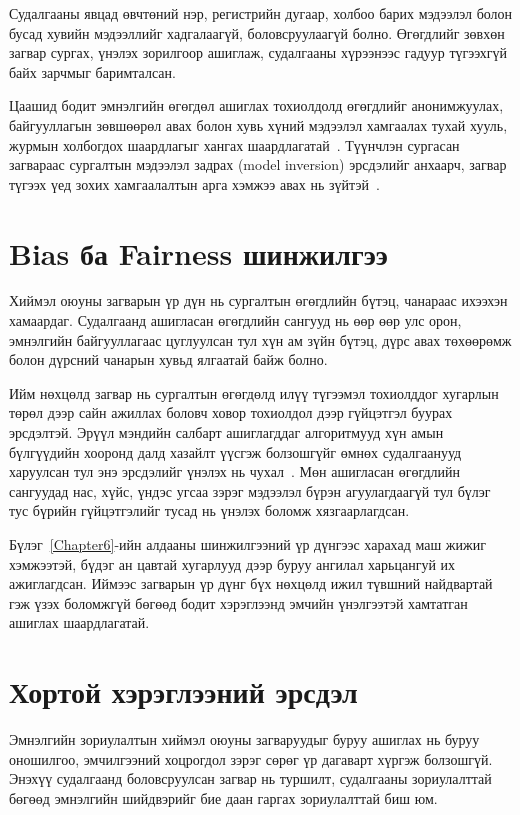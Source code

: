 Судалгааны явцад өвчтөний нэр, регистрийн дугаар, холбоо барих мэдээлэл болон бусад хувийн мэдээллийг хадгалаагүй, боловсруулаагүй болно. Өгөгдлийг зөвхөн загвар сургах, үнэлэх зорилгоор ашиглаж, судалгааны хүрээнээс гадуур түгээхгүй байх зарчмыг баримталсан.

Цаашид бодит эмнэлгийн өгөгдөл ашиглах тохиолдолд өгөгдлийг анонимжуулах, байгууллагын зөвшөөрөл авах болон хувь хүний мэдээлэл хамгаалах тухай хууль, журмын холбогдох шаардлагыг хангах шаардлагатай~\cite{ref48}. Түүнчлэн сургасан загвараас сургалтын мэдээлэл задрах (model inversion) эрсдэлийг анхаарч, загвар түгээх үед зохих хамгаалалтын арга хэмжээ авах нь зүйтэй~\cite{ref49}.

\section{Bias ба Fairness шинжилгээ}

Хиймэл оюуны загварын үр дүн нь сургалтын өгөгдлийн бүтэц, чанараас ихээхэн хамаардаг. Судалгаанд ашигласан өгөгдлийн сангууд нь өөр өөр улс орон, эмнэлгийн байгууллагаас цуглуулсан тул хүн ам зүйн бүтэц, дүрс авах төхөөрөмж болон дүрсний чанарын хувьд ялгаатай байж болно.

Ийм нөхцөлд загвар нь сургалтын өгөгдөлд илүү түгээмэл тохиолддог хугарлын төрөл дээр сайн ажиллах боловч ховор тохиолдол дээр гүйцэтгэл буурах эрсдэлтэй. Эрүүл мэндийн салбарт ашиглагддаг алгоритмууд хүн амын бүлгүүдийн хооронд далд хазайлт үүсгэж болзошгүйг өмнөх судалгаанууд харуулсан тул энэ эрсдэлийг үнэлэх нь чухал~\cite{ref47}. Мөн ашигласан өгөгдлийн сангуудад нас, хүйс, үндэс угсаа зэрэг мэдээлэл бүрэн агуулагдаагүй тул бүлэг тус бүрийн гүйцэтгэлийг тусад нь үнэлэх боломж хязгаарлагдсан.

Бүлэг~\ref{Chapter6}-ийн алдааны шинжилгээний үр дүнгээс харахад маш жижиг хэмжээтэй, бүдэг ан цавтай хугарлууд дээр буруу ангилал харьцангуй их ажиглагдсан. Иймээс загварын үр дүнг бүх нөхцөлд ижил түвшний найдвартай гэж үзэх боломжгүй бөгөөд бодит хэрэглээнд эмчийн үнэлгээтэй хамтатган ашиглах шаардлагатай.

\section{Хортой хэрэглээний эрсдэл}

Эмнэлгийн зориулалтын хиймэл оюуны загваруудыг буруу ашиглах нь буруу оношилгоо, эмчилгээний хоцрогдол зэрэг сөрөг үр дагаварт хүргэж болзошгүй. Энэхүү судалгаанд боловсруулсан загвар нь туршилт, судалгааны зориулалттай бөгөөд эмнэлгийн шийдвэрийг бие даан гаргах зориулалттай биш юм.

